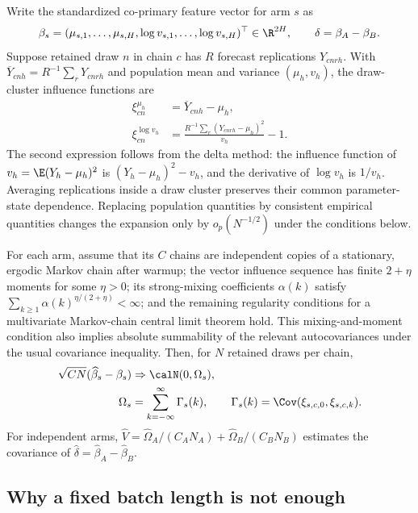 Write the standardized co-primary feature vector for arm $s$ as
\begin{equation}
  \beta_s=
  (\mu_{s,1},\ldots,\mu_{s,H},
   \log v_{s,1},\ldots,\log v_{s,H})^\top\in\R^{2H},
  \qquad
  \delta=\beta_A-\beta_B.
  \label{eq:bf-ssl-lstm-primary-feature-vector}
\end{equation}
Suppose retained draw $n$ in chain $c$ has $R$ forecast replications
$Y_{cnrh}$.  With $\overline Y_{cn h}=R^{-1}\sum_rY_{cnrh}$ and population
mean and variance $(\mu_h,v_h)$, the draw-cluster influence functions are
\begin{align}
  \xi^{\mu_h}_{cn}
    &=\overline Y_{cn h}-\mu_h,                                             \\
  \xi^{\log v_h}_{cn}
    &=\frac{R^{-1}\sum_r(Y_{cnrh}-\mu_h)^2}{v_h}-1.
  \label{eq:bf-ssl-lstm-feature-influence}
\end{align}
The second expression follows from the delta method: the influence function
of $v_h=\E(Y_h-\mu_h)^2$ is $(Y_h-\mu_h)^2-v_h$, and the derivative of
$\log v_h$ is $1/v_h$.  Averaging replications inside a draw cluster preserves
their common parameter-state dependence.  Replacing population quantities by
consistent empirical quantities changes the expansion only by $o_p(N^{-1/2})$
under the conditions below.

For each arm, assume that its $C$ chains are independent copies of a stationary,
ergodic Markov chain after warmup; the vector influence sequence has finite
$2+\eta$ moments for some $\eta>0$; its strong-mixing coefficients
$\alpha(k)$ satisfy
$\sum_{k\geq1}\alpha(k)^{\eta/(2+\eta)}<\infty$; and the remaining regularity
conditions for a multivariate Markov-chain central limit theorem hold.  This
mixing-and-moment condition also implies absolute summability of the relevant
autocovariances under the usual covariance inequality.  Then, for $N$ retained
draws per chain,
\begin{align}
  \sqrt{CN}(\widehat\beta_s-\beta_s)
    &\Rightarrow\calN(0,\Omega_s),                                         \\
  \Omega_s
    &=\sum_{k=-\infty}^{\infty}\Gamma_s(k),
  \qquad
  \Gamma_s(k)=\Cov(\xi_{s,c,0},\xi_{s,c,k}).
  \label{eq:bf-ssl-lstm-feature-clt}
\end{align}
For independent arms,
$\widehat V=\widehat\Omega_A/(C_A N_A)+
\widehat\Omega_B/(C_B N_B)$ estimates the covariance of
$\widehat\delta=\widehat\beta_A-\widehat\beta_B$.

\subsection{Why a fixed batch length is not enough}

